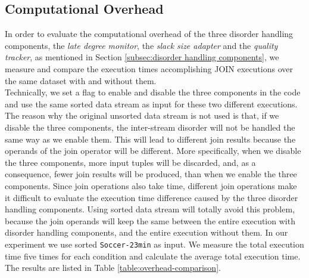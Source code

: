 \documentclass[a4paper, 11pt, twoside]{report}
\begin{document}
\clearpage

\subsection{Computational Overhead}
\label{subsec:computational-overhead}
In order to evaluate the computational overhead of the three disorder handling components, the \textit{late degree monitor}, the \textit{slack size adapter} and the \textit{quality tracker}, as mentioned in Section \ref{subsec:disorder handling components}, we measure and compare the execution times accomplishing JOIN executions over the same dataset with and without them.\\

Technically, we set a flag to enable and disable the three components in the code and use the same sorted data stream as input for these two different executions. The reason why the original unsorted data stream is not used is that, if we disable the three components, the inter-stream disorder will not be handled the same way as we enable them. This will lead to different join results because the operands of the join operator will be different. More specifically, when we disable the three components, more input tuples will be discarded, and, as a consequence, fewer join results will be produced, than when we enable the three components. Since join operations also take time, different join operations make it difficult to evaluate the execution time difference caused by the three disorder handling components. Using sorted data stream will totally avoid this problem, because the join operands will keep the same between the entire execution with disorder handling components, and the entire execution without them. In our experiment we use sorted \texttt{Soccer-23min} as input. We measure the total execution time five times for each condition and calculate the average total execution time. The results are listed in Table \ref{table:overhead-comparison}.\\
\end{document}
